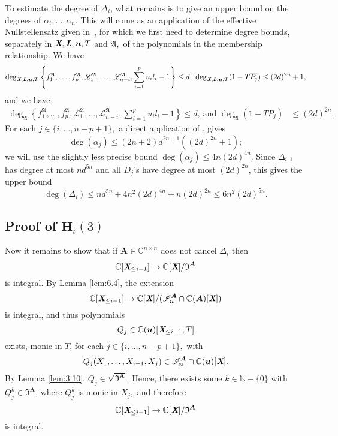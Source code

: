 \documentclass[a4paper]{article}
\def\A{\mathfrak{A}}
\def\Lb{\textit{\textbf{L}}}
\def\Xb{\textit{\textbf{X}}}
\def\mA{{\bm A}}
\def\ub{{\bm u}}
\def\pjb{\overline{P_{j}}}
\def\D{\Delta}
\def\C{\mathbb{C}}
\def\I{\mathfrak{I}}
\def\Il{\mathscr{I}_{\ub}}
\def\udl{\sum_{i=1}^pu_il_i}
\begin{document}
\noindent
To estimate the degree of $\D_{i}$, what remains is to give an upper
bound on the degrees of $\alpha_i,\dots,\alpha_n$. This will come as an
application of the effective Nullstellensatz given in~\cite{EN}, for
which we first need to determine degree bounds, separately in $\Xb,\Lb,\ub,T$
and $\A,$ of the polynomials in the membership relationship. We have
\begin{align*}
\deg_{\Xb,\Lb,\ub,T}
\left\{ 
f_1^\A,\hdots,f_p^\A,\mathscr{L}_1^\A, \hdots, \mathscr{L}_{n-i}^\A, \udl-1
\right\}
\leq d, ~
\deg_{\Xb,\Lb,\ub,T}(1-T\pjb) \leq (2d)^{2n} +1, 
\end{align*}
and we have 
\begin{align*}
\deg_{\A}  
\left\{ 
f_1^\A,\hdots,f_p^\A,\mathscr{L}_1^\A, \hdots, \mathscr{L}_{n-i}^\A, \udl-1
\right\} 
\leq d,~\textrm{and }
\deg_{\A}(1-T\pjb)& \leq (2d)^{2n}.
\end{align*}
For each $j \in \{i,\hdots,n-p+1\},$ a direct application of \cite[Theorem
0.5]{EN}, gives 
\[
\deg(\alpha_j) \le (2n+2)d^{2n+1}((2d)^{2n}+1);
\]
we will use
the slightly less precise bound $\deg(\alpha_j) \le 4n(2d)^{4n}$. Since $\D_{i,1}$ has degree at most
$nd^{5n}$ and all $D_j$'s have degree at most $(2d)^{2n}$, this gives
the upper bound
$$\deg(\D_i) \le nd^{5n} +  4n^2(2d)^{4n} + n(2d)^{2n} \leq 6n^2(2d)^{5n}.$$


\subsection{Proof of $\textbf{H}_i(3)$}
Now it remains to show that if $\mA \in \C^{n\times n}$ does not cancel $\D_{i}$ then
\[
 \C[\Xb_{\leq i-1}]\rightarrow \C[\Xb]/\I^{\mA}
\]
is integral. 
\noindent
By Lemma \ref{lem:6.4}, the extension
\[
 \C[\Xb_{\leq i-1}]\rightarrow \C[\Xb]/(\Il^{\mA} \cap \C(\mA)[\Xb])
\]
is integral, and thus polynomials 
\[
Q_j \in \C(\ub)[\Xb_{\leq i-1},T]
\]
exists, monic in $T$, for each $j \in \{i,\hdots,n-p+1\},$ with
\begin{align*}
Q_j(X_1,\hdots,X_{i-1},X_j) \in \Il^{\mA} \cap \C(\ub)[\Xb].
\end{align*}
%
By Lemma \ref{lem:3.10}, $Q_j \in \sqrt{\I^{\mA}}.$ Hence, there exists some $k \in \mathbb{N}-\{0\}$ with $Q_j^{k} \in\I^{\mA}$, where $Q_j^k$ is monic in $X_j,$ and therefore
\[
 \C[\Xb_{\leq i-1}]\rightarrow \C[\Xb]/\I^{\mA}
\]
is integral.
\end{document}
